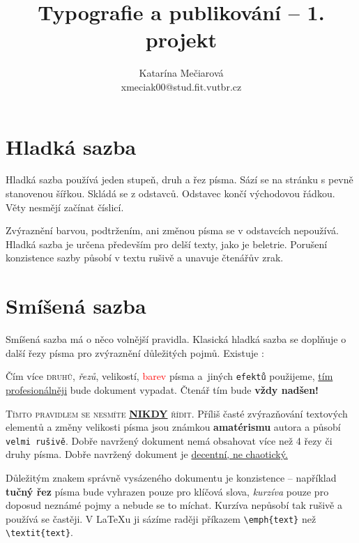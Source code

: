 \documentclass[10pt]{article}[25.2.2024]
\title{Typografie a publikování -- 1. projekt}
\author{Katarína Mečiarová\\xmeciak00@stud.fit.vutbr.cz}
\date{}
\begin{document}
\maketitle
{}

\begin{multicols}{2}
\section{Hladká sazba}
Hladká sazba používá jeden stupeň, druh a řez písma.
Sází se na stránku s pevně stanovenou šířkou.
Skládá se z odstavců. Odstavec končí východovou řádkou.
Věty nesmějí začínat číslicí.

Zvýraznění barvou, podtržením, ani změnou písma se v odstavcích nepoužívá.
Hladká sazba je určena především pro delší texty, jako je beletrie.
Porušení konzistence sazby působí v textu rušivě a unavuje čtenářův zrak.

\section{Smíšená sazba}
Smíšená sazba má o něco volnější pravidla.
Klasická hladká sazba se doplňuje o další řezy písma pro zvýraznění důležitých pojmů.
Existuje :

\medskip
\begin{adjustwidth}{0.8cm}{0.8cm}
\hspace{0.3cm}
Čím více \textsc{druhů}, \textit{řezů}, {\scriptsize velikostí}, \textcolor{red}{barev} písma a~jiných \texttt{efektů} použijeme, \underline{tím profesionálněji}
bude {\selectfont dokument} vypadat. Čtenář tím bude {\huge \bfseries vždy nadšen!}
\end{adjustwidth}
\medskip

\textsc{Tímto pravidlem se nesmíte \underline{\textbf{\MakeUppercase{\scriptsize nikdy}}} řídit.}
Příliš časté zvýrazňování textových elementů a změny {\tiny velikosti} písma jsou známkou \textbf{amatérismu} autora a působí \texttt{velmi rušivě}.
Dobře navržený dokument nemá obsahovat více než 4 řezy či druhy písma.
Dobře navržený dokument je \underline{decentní, ne chaotický.}

Důležitým znakem správně vysázeného dokumentu je konzistence -- například \textbf{tučný řez} písma bude vyhrazen pouze pro klíčová slova, \textit{kurzíva} pouze pro doposud neznámé pojmy a nebude se to míchat.
Kurzíva nepůsobí tak rušivě a používá se častěji.
V \LaTeX u ji sázíme raději příkazem \verb|\emph{text}| než \verb|\textit{text}|.


\end{multicols}
\end{document}
